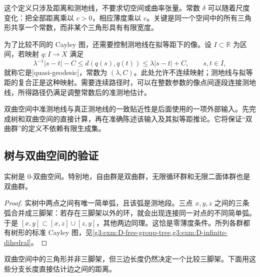 这个定义只涉及距离和测地线，不要求切空间或曲率张量。常数 \(\delta\) 可以随着尺度变化：把全部距离乘以 \(c>0\)，相应薄度乘以 \(c\)。关键是同一个空间中的所有三角形共享一个常数，而非某个三角形具有有限宽度。

\ProseParagraphBreak

为了比较不同的 Cayley 图，还需要控制测地线在拟等距下的像。设 \(I\subset\mathbb R\) 为区间，若映射 \(q:I\rightarrow X\) 满足
\[
	\lambda^{-1}|s-t|-C\le d(q(s),q(t))\le\lambda|s-t|+C,
	\qquad s,t\in I,
\]
就称它是[quasi-geodesic]，常数为 \((\lambda,C)\)。此处允许不连续映射；测地线与拟等距的复合正是这种映射。需要连续路径时，可以在整数参数的像点间逐段连接测地线，所得路径仍满足调整常数后的准测地估计。

\ProseParagraphBreak

双曲空间中准测地线与真正测地线的一致贴近性是后面使用的一项外部输入。先完成树和双曲空间的直接计算，再在准确陈述该输入及其拟等距推论。它将保证“双曲群”的定义不依赖有限生成集。

\subsection{树与双曲空间的验证}
\label{g3:subsec:D03:02}

\begin{proposition}\label{g3:prop:D-tree-hyperbolic}
	实树是 \(0\)-双曲空间。特别地，自由群是双曲群，无限循环群和无限二面体群也是双曲群。
\end{proposition}
\begin{proof}
	实树中两点之间有唯一简单弧，且该弧是测地段。三点 \(x,y,z\) 之间的三条弧合并成三脚架：若存在三脚架以外的环，就会出现连接同一对点的不同简单弧。于是 \([x,y]\subset[x,z]\cup[z,y]\)，其他两边同理。这恰是零薄度条件。所列各群都有树形的标准 Cayley 图，见\cref{g3:exm:D-free-group-tree,g3:exm:D-infinite-dihedral}。
\end{proof}

双曲空间中的三角形并非三脚架，但三边长度仍然决定一个比较三脚架。下面用这些分支长度直接估计边之间的距离。

